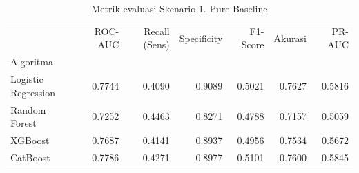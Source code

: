 \begin{table}[htbp]
\caption{Metrik evaluasi Skenario 1. Pure Baseline}
\label{tab:ablasi1}
\begin{tabular}{lrrrrrr}
\toprule
 & ROC-AUC & Recall (Sens) & Specificity & F1-Score & Akurasi & PR-AUC \\
Algoritma &  &  &  &  &  &  \\
\midrule
Logistic Regression & 0.7744 & 0.4090 & 0.9089 & 0.5021 & 0.7627 & 0.5816 \\
Random Forest & 0.7252 & 0.4463 & 0.8271 & 0.4788 & 0.7157 & 0.5059 \\
XGBoost & 0.7687 & 0.4141 & 0.8937 & 0.4956 & 0.7534 & 0.5672 \\
CatBoost & 0.7786 & 0.4271 & 0.8977 & 0.5101 & 0.7600 & 0.5845 \\
\bottomrule
\end{tabular}
\end{table}
